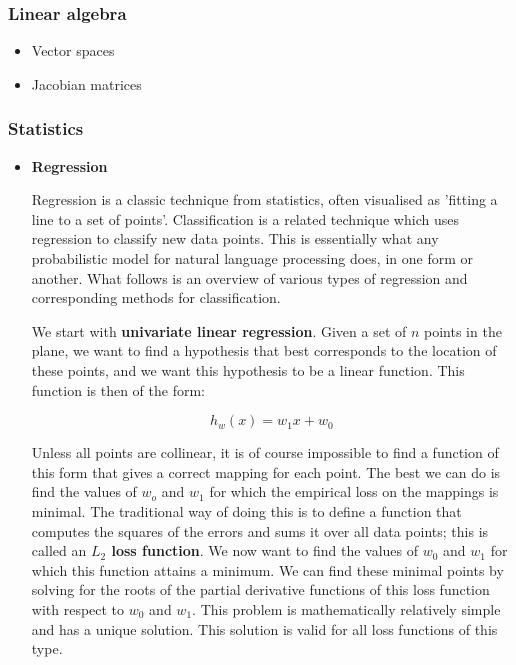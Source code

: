 \subsubsection{Linear algebra}
\label{sec:linearalgebra}
\begin{itemize}
  \item Vector spaces
  \item Jacobian matrices
\end{itemize}

\subsubsection{Statistics}
\label{sec:statistics}
\begin{itemize}
\item { 
    \textbf{Regression}

    Regression is a classic technique from statistics, often visualised as
    'fitting a line to a set of points'. Classification is a related
    technique which uses regression to classify new data points. This is
    essentially what any probabilistic model for natural language
    processing does, in one form or another. What follows is an overview
    of various types of regression and corresponding methods for
    classification.

    We start with \textbf{univariate linear regression}. Given a set
    of $n$ points in the plane, we want to find a hypothesis that best
    corresponds to the location of these points, and we want this
    hypothesis to be a linear function. This function is then of the form:

    \begin{equation}
      h_w(x) = w_1x + w_0
    \end{equation}

    Unless all points are collinear, it is of course impossible to
    find a function of this form that gives a correct mapping for each
    point. The best we can do is find the values of $w_o$ and $w_1$ for
    which the empirical loss on the mappings is minimal. The traditional
    way of doing this is to define a function that computes the squares of
    the errors and sums it over all data points; this is called an
    \textbf{$L_2$ loss function}. We now want to find the values of $w_0$
    and $w_1$ for which this function attains a minimum. We can find these
    minimal points by solving for the roots of the partial derivative
    functions of this loss function with respect to $w_0$ and $w_1$.  This
    problem is mathematically relatively simple and has a unique
    solution. This solution is valid for all loss functions of this type.

}
\end{itemize}
